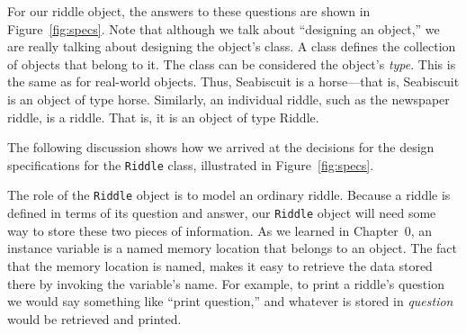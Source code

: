 For our riddle object, the answers to these questions are 
shown in Figure~\ref{fig:specs}. Note that although we talk about
``designing an object,'' we are really talking about designing the
object's class. A class defines the collection of objects that belong
to it. The class can be considered the object's {\em type}. This is
the same as for real-world objects. Thus, Seabiscuit is a horse---that
is, Seabiscuit is an object of type horse.  Similarly, an individual
riddle, such as the newspaper riddle, is a riddle.  That is, it is an
object of type Riddle.

The following discussion shows how we arrived at the decisions for the
design specifications for the {\tt Riddle} class, illustrated in
Figure~\ref{fig:specs}.

\begin{figure}[h]
\end{figure}

The role of the {\tt Riddle} object is to model an ordinary
riddle. Because a riddle is defined in terms of its question and
answer, our {\tt Riddle} object will need some way to store these two
pieces of information. As we learned in Chapter~0, an instance
variable is a named memory location that belongs to an object. The
fact that the memory location is named, makes it easy to retrieve the
data stored there by invoking the variable's name. For example, to
print a riddle's question we would say something like ``print
question,'' and whatever is stored in {\em question} would be
retrieved and printed.


